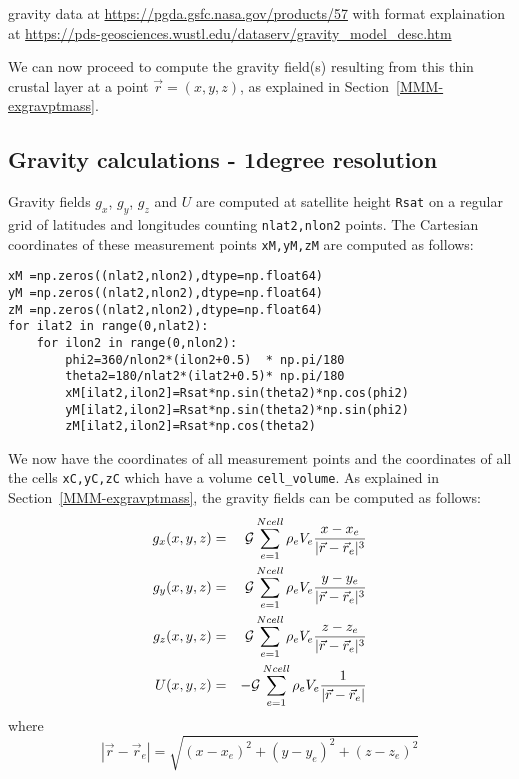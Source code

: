 gravity data at \url{https://pgda.gsfc.nasa.gov/products/57}
with format explaination at \url{https://pds-geosciences.wustl.edu/dataserv/gravity_model_desc.htm}

We can now proceed to compute the gravity field(s) 
resulting from this thin crustal layer at a point $\vec{r}=(x,y,z)$, as 
explained in Section~\ref{MMM-exgravptmass}.

\subsection*{Gravity calculations - 1degree resolution}

Gravity fields $g_x$, $g_y$, $g_z$ and $U$ are computed at satellite height \lstinline{Rsat}
on a regular grid of latitudes and longitudes counting \lstinline{nlat2,nlon2} points. 
The Cartesian coordinates of these measurement points \lstinline{xM,yM,zM} 
are computed as follows:
\begin{lstlisting}
xM =np.zeros((nlat2,nlon2),dtype=np.float64)
yM =np.zeros((nlat2,nlon2),dtype=np.float64)
zM =np.zeros((nlat2,nlon2),dtype=np.float64)
for ilat2 in range(0,nlat2):
    for ilon2 in range(0,nlon2): 
        phi2=360/nlon2*(ilon2+0.5)  * np.pi/180
        theta2=180/nlat2*(ilat2+0.5)* np.pi/180
        xM[ilat2,ilon2]=Rsat*np.sin(theta2)*np.cos(phi2)
        yM[ilat2,ilon2]=Rsat*np.sin(theta2)*np.sin(phi2)
        zM[ilat2,ilon2]=Rsat*np.cos(theta2)
\end{lstlisting}
We now have the coordinates of all measurement points and the coordinates of all the 
cells \lstinline{xC,yC,zC} which have a volume \lstinline{cell_volume}.
As explained in Section~\ref{MMM-exgravptmass}, the gravity fields can be computed as 
follows:
\begin{eqnarray}
g_x(x,y,z) &=& {\cal G}  \sum_{e=1}^{Ncell} \rho_e V_e  \frac{x-x_e}{|\vec{r}-\vec{r}_e|^3} \label{eqq:gravdiscr1}\\
g_y(x,y,z) &=& {\cal G}  \sum_{e=1}^{Ncell} \rho_e V_e  \frac{y-y_e}{|\vec{r}-\vec{r}_e|^3} \label{eqq:gravdiscr2}\\
g_z(x,y,z) &=& {\cal G}  \sum_{e=1}^{Ncell} \rho_e V_e  \frac{z-z_e}{|\vec{r}-\vec{r}_e|^3} \label{eqq:gravdiscr3}\\
U(x,y,z)   &=& -{\cal G} \sum_{e=1}^{Ncell} \rho_e V_e  \frac{1}{|\vec{r}-\vec{r}_e|}       \label{eqq:gravdiscr4}
\end{eqnarray}
where 
\[
|\vec{r}-\vec{r}_e|=\sqrt{ (x-x_e)^2+(y-y_e)^2+(z-z_e)^2   }
\]
